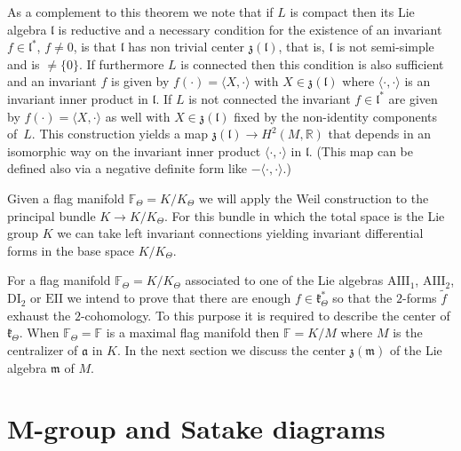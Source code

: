 \documentclass[pdftex]{sigma}
\numberwithin{equation}{section}
\begin{document}
As a complement to this theorem we note that if $L$ is compact then its Lie algebra $\mathfrak{l}$ is reductive and a necessary condition for the existence of an invariant $f\in \mathfrak{l}^{\ast }$, $f\neq 0$, is that $\mathfrak{l}$ has non trivial center $\mathfrak{z} ( \mathfrak{l})$, that is, $\mathfrak{l}$ is not semi-simple and is $\neq \{0\}$. If furthermore $L$ is connected then this condition is also sufficient and an invariant $f$ is given by $f(\cdot) =\langle X,\cdot \rangle $ with $X\in \mathfrak{z} ( \mathfrak{l} ) $ where $\langle \cdot,\cdot \rangle $ is an invariant inner product in $\mathfrak{l}$. If $L$ is not connected the invariant $f\in \mathfrak{l}^{\ast }$ are given by $f ( \cdot ) =\langle X,\cdot \rangle $ as well with $X\in \mathfrak{z} ( \mathfrak{l} ) $ fixed by the non-identity components of~$L$. This construction yields a map $\mathfrak{z} ( \mathfrak{l} ) \rightarrow H^{2} ( M,\mathbb{R} ) $ that depends in an isomorphic way on the invariant inner product $\langle \cdot,\cdot \rangle $ in $\mathfrak{l}$. (This map can be defined also via a negative definite form like $-\langle \cdot,\cdot \rangle $.)

Given a flag manifold $\mathbb{F}_{\Theta }=K/K_{\Theta }$ we will apply the Weil construction to the principal bundle $K\rightarrow K/K_{\Theta }$. For this bundle in which the total space is the Lie group $K$ we can take left invariant connections yielding invariant differential forms in the base space $K/K_{\Theta }$.

For a flag manifold $\mathbb{F}_{\Theta }=K/K_{\Theta }$ associated to one of the Lie algebras $\mathrm{AIII}_{1}$, $\mathrm{AIII}_{2}$, $\mathrm{DI}_{2}$ or $\mathrm{EII}$ we intend to prove that there are enough $f\in \mathfrak{k}_{\Theta }^{\ast }$ so that the $2$-forms $\widetilde{f}$ exhaust the $2$-cohomology. To this purpose it is required to describe the center of $\mathfrak{k}_{\Theta }$. When $\mathbb{F}_{\Theta }=\mathbb{F}$ is a maximal flag manifold then $\mathbb{F}=K/M$ where $M$ is the centralizer of $\mathfrak{a}$ in $K$. In the next section we discuss the center $\mathfrak{z}(\mathfrak{m}) $ of the Lie algebra $\mathfrak{m}$ of $M$.

\section[$M$-group and Satake diagrams]{$\boldsymbol{M}$-group and Satake diagrams}\label{seccenterM}
\end{document}
